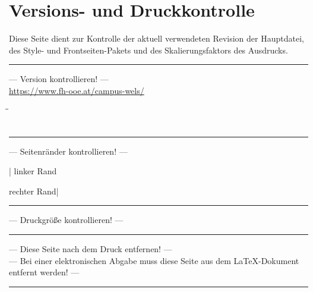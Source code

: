 \chapter*{Versions- und Druckkontrolle}
\thispagestyle{plain}
Diese Seite dient zur Kontrolle der aktuell verwendeten Revision der Hauptdatei, des Style- und Frontseiten-Pakets und des Skalierungsfaktors des Ausdrucks.\\
\rule{15cm}{0.3mm}
\begin{center}
	{\Large --- Version kontrollieren! ---}\\
	{\small \url{https://www.fh-ooe.at/campus-wels/}}\\
\end{center}
\begin{tabbing}
	\hspace{4cm}\=\hspace{4.5cm}\=\kill
	\>{\CurrentVersionMain ---}\\ 
	\>{\CurrentVersionStyle ---}\\ 
	\>{\CurrentVersionFrontpages ---} 
\end{tabbing} 
\rule{15cm}{0.3mm}
\begin{center}
	{\Large --- Seitenränder kontrollieren! ---}
\end{center}
\begin{flushleft}
	| linker Rand
\end{flushleft}
\vspace{-2.875\baselineskip}
\begin{flushright}
	rechter Rand|
\end{flushright}
\vspace{-\baselinestretch\baselineskip}
\rule{15cm}{0.3mm}
\begin{center}
	{\Large --- Druckgröße kontrollieren! ---}\\
	\bigskip
\end{center}
\rule{15cm}{0.3mm}
\begin{center}
	{\Large --- Diese Seite nach dem Druck entfernen! ---}\\
	\quad\newline
	{\Large --- Bei einer elektronischen Abgabe muss diese Seite aus dem \LaTeX-Dokument entfernt werden! ---}
\end{center}
\rule{15cm}{0.3mm}
